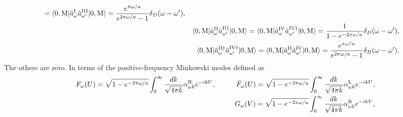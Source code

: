 \documentclass[aps,prd,preprintnumbers,nofootinbib,showpacs]{revtex4}%
\begin{document}
\begin{widetext}
\begin{eqnarray}
= \langle0,{\rm M}|\hat a_{\omega}^{\rm I }\hat a_{\omega'}^{\rm III}|0,{\rm M}\rangle
={e^{\pi\omega/a}\over e^{2\pi\omega/a}-1}\delta_D(\omega-\omega'),
\nonumber
\\
&& \langle0,{\rm M}|\hat a_{\omega}^{\rm II}\hat a_{\omega'}^{\rm II \dagger}|0,{\rm M}\rangle
=\langle0,{\rm M}|\hat a_{\omega}^{\rm IV}\hat a_{\omega'}^{\rm IV \dagger}|0,{\rm M}\rangle
={1\over 1- e^{-2\pi\omega/a} }\delta_D(\omega-\omega'),
\nonumber
\\
&&\langle0,{\rm M}|\hat a_{\omega}^{\rm II \dagger}\hat a_{\omega'}^{\rm IV \dagger}|0,{\rm M}\rangle
= \langle0,{\rm M}|\hat a_{\omega}^{\rm II }\hat a_{\omega'}^{\rm IV}|0,{\rm M}\rangle
={e^{\pi\omega/a}\over e^{2\pi\omega/a}-1}\delta_D(\omega-\omega') .
\nonumber
\\
\end{eqnarray}
The others are zero. 
In terms of the positive-frequency Minkowski  modes defined as 
\begin{eqnarray}
&&F_\omega(U)=\sqrt{1-e^{-2\pi\omega/a}}\int_0^\infty {dk\over \sqrt{4\pi k}} \alpha_{\omega k}^{\rm R} e^{-ik U},
\hspace{10mm}
\bar F_\omega(U)=\sqrt{1-e^{-2\pi\omega/a}}\int_0^\infty {dk\over \sqrt{4\pi k}} \alpha_{\omega k}^{\rm L} e^{-ik U},
\nonumber\\ 
&&G_\omega(V)=\sqrt{1-e^{-2\pi\omega/a}}\int_0^\infty {dk\over \sqrt{4\pi k}} \alpha_{\omega k}^{\rm R} e^{-ik V},

\end{eqnarray}
\end{widetext}
\end{document}
